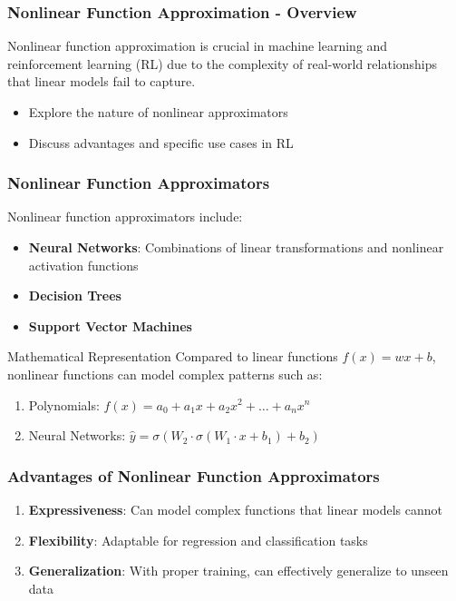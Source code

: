 \documentclass[aspectratio=169]{beamer}
\begin{document}
\begin{frame}[fragile]
    \frametitle{Nonlinear Function Approximation - Overview}
    Nonlinear function approximation is crucial in machine learning and reinforcement learning (RL) due to the complexity of real-world relationships that linear models fail to capture. 
    \begin{itemize}
        \item Explore the nature of nonlinear approximators
        \item Discuss advantages and specific use cases in RL
    \end{itemize}
\end{frame}

\begin{frame}[fragile]
    \frametitle{Nonlinear Function Approximators}
    Nonlinear function approximators include:
    \begin{itemize}
        \item \textbf{Neural Networks}: Combinations of linear transformations and nonlinear activation functions
        \item \textbf{Decision Trees}
        \item \textbf{Support Vector Machines}
    \end{itemize}
    \begin{block}{Mathematical Representation}
        Compared to linear functions \( f(x) = wx + b \), nonlinear functions can model complex patterns such as:
        \begin{enumerate}
            \item Polynomials: \( f(x) = a_0 + a_1 x + a_2 x^2 + \ldots + a_n x^n \)
            \item Neural Networks: \( \hat{y} = \sigma(W_2 \cdot \sigma(W_1 \cdot x + b_1) + b_2) \)
        \end{enumerate}
    \end{block}
\end{frame}

\begin{frame}[fragile]
    \frametitle{Advantages of Nonlinear Function Approximators}
    \begin{enumerate}
        \item \textbf{Expressiveness}: Can model complex functions that linear models cannot
        \item \textbf{Flexibility}: Adaptable for regression and classification tasks
        \item \textbf{Generalization}: With proper training, can effectively generalize to unseen data
    \end{enumerate}
\end{frame}
\end{document}
